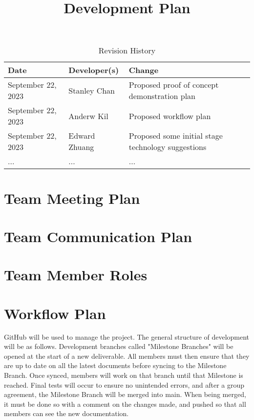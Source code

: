 \documentclass{article}
\title{Development Plan\\\progname}
\author{\authname}
\date{}
\begin{document}
\maketitle

\begin{table}[hp]
\caption{Revision History} \label{TblRevisionHistory}
\begin{tabularx}{\textwidth}{llX}
\toprule
\textbf{Date} & \textbf{Developer(s)} & \textbf{Change}\\
\midrule
September 22, 2023 & Stanley Chan & Proposed proof of concept demonstration plan\\
September 22, 2023 & Anderw Kil & Proposed workflow plan\\
September 22, 2023 & Edward Zhuang & Proposed some initial stage technology suggestions\\
... & ... & ...\\
\bottomrule
\end{tabularx}
\end{table}


\section{Team Meeting Plan}

\section{Team Communication Plan}

\section{Team Member Roles}

\section{Workflow Plan}

GitHub will be used to manage the project. The general structure of development will be as follows. Development branches called "Milestone Branches" will be opened at the start of a new deliverable. All members must then ensure that they are up to date on all the latest documents before syncing to the Milestone Branch. Once synced, members will work on that branch until that Milestone is reached. Final tests will occur to ensure no unintended errors, and after a group agreement, the Milestone Branch will be merged into main. When being merged, it must be done so with a comment on the changes made, and pushed so that all members can see the new documentation.
\end{document}
